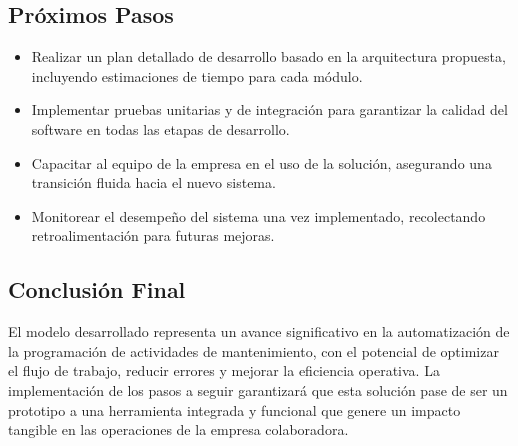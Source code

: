 \documentclass{article}
\begin{document}
\subsection{Próximos Pasos}

\begin{itemize}
    \item Realizar un plan detallado de desarrollo basado en la arquitectura propuesta, incluyendo estimaciones de tiempo para cada módulo.
    \item Implementar pruebas unitarias y de integración para garantizar la calidad del software en todas las etapas de desarrollo.
    \item Capacitar al equipo de la empresa en el uso de la solución, asegurando una transición fluida hacia el nuevo sistema.
    \item Monitorear el desempeño del sistema una vez implementado, recolectando retroalimentación para futuras mejoras.
\end{itemize}



\subsection{Conclusión Final}  
El modelo desarrollado representa un avance significativo en la automatización de la programación de actividades de mantenimiento, con el potencial de optimizar el flujo de trabajo, reducir errores y mejorar la eficiencia operativa. La implementación de los pasos a seguir garantizará que esta solución pase de ser un prototipo a una herramienta integrada y funcional que genere un impacto tangible en las operaciones de la empresa colaboradora.


\newpage
\end{document}
